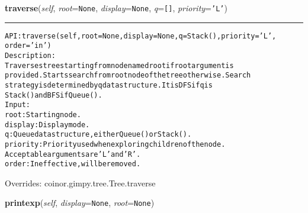     \vspace{0.5ex}

\hspace{.8\funcindent}\begin{boxedminipage}{\funcwidth}

    \raggedright \textbf{traverse}(\textit{self}, \textit{root}={\tt None}, \textit{display}={\tt None}, \textit{q}={\tt []}, \textit{priority}={\tt \texttt{'}\texttt{L}\texttt{'}})

    \vspace{-1.5ex}

    \rule{\textwidth}{0.5\fboxrule}
\setlength{\parskip}{2ex}
\begin{alltt}

API: traverse(self, root=None, display=None, q=Stack(), priority='L',
              order='in')
Description:
    Traverses tree starting from node named root if root argument is
    provided. Starts search from root node of the tree otherwise. Search
    strategy is determined by q data structure. It is DFS if q is
    Stack() and BFS if Queue().
Input:
    root: Starting node.
    display: Display mode.
    q: Queue data structure, either Queue() or Stack().
    priority: Priority used when exploring children of the node.
    Acceptable arguments are 'L' and 'R'.
    order: Ineffective, will be removed.
\end{alltt}

\setlength{\parskip}{1ex}
      Overrides: coinor.gimpy.tree.Tree.traverse

    \end{boxedminipage}

    \label{coinor:gimpy:tree:BinaryTree:printexp}

    \vspace{0.5ex}

\hspace{.8\funcindent}\begin{boxedminipage}{\funcwidth}

    \raggedright \textbf{printexp}(\textit{self}, \textit{display}={\tt None}, \textit{root}={\tt None})

\setlength{\parskip}{2ex}
\setlength{\parskip}{1ex}
    \end{boxedminipage}

    \label{coinor:gimpy:tree:BinaryTree:postordereval}

